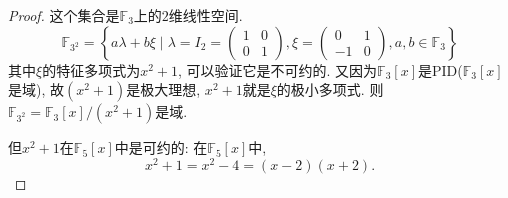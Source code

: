 \begin{proof}
    这个集合是$\mathbb{F}_3$上的$2$维线性空间.
\[
    \mathbb{F}_{3^2} = \left\{ a\lambda + b\xi \mid
    \lambda = I_2 = 
    \begin{pmatrix}
        1 & 0\\
        0 & 1
    \end{pmatrix},
    \xi = 
    \begin{pmatrix} 
        0 & 1\\
        -1 & 0
    \end{pmatrix}, a, b \in \mathbb{F}_3 \right\}
\]
其中$\xi$的特征多项式为$x^2 + 1$, 可以验证它是不可约的. 又因为$\mathbb{F}_3[x]$是PID($\mathbb{F}_3[x]$是域), 故$(x^2 + 1)$是极大理想, $x^2 + 1$就是$\xi$的极小多项式. 则$\mathbb{F}_{3^2} = \mathbb{F}_3[x]/(x^2 + 1)$是域.

但$x^2 + 1$在$\mathbb{F}_5[x]$中是可约的: 在$\mathbb{F}_5[x]$中, 
\[
    x^2 + 1 = x^2 - 4 = (x - 2)(x + 2).
\]
\end{proof}